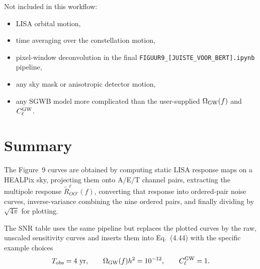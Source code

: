 \documentclass[11pt]{article}
\begin{document}
Not included in this workflow:
\begin{itemize}
\item LISA orbital motion,
\item time averaging over the constellation motion,
\item pixel-window deconvolution in the final \texttt{FIGUUR9\_[JUISTE\_VOOR\_BERT].ipynb} pipeline,
\item any sky mask or anisotropic detector motion,
\item any SGWB model more complicated than the user-supplied $\Omega_{\rm GW}(f)$ and $C_\ell^{\rm GW}$.
\end{itemize}

\section{Summary}
The Figure~9 curves are obtained by computing static LISA response maps on a HEALPix sky, projecting them onto A/E/T channel pairs, extracting the multipole response $\widetilde R^\ell_{OO'}(f)$, converting that response into ordered-pair noise curves, inverse-variance combining the nine ordered pairs, and finally dividing by $\sqrt{4\pi}$ for plotting.

The SNR table uses the same pipeline but replaces the plotted curves by the raw, unscaled sensitivity curves and inserts them into Eq.~(4.44) with the specific example choices
\begin{equation}
T_{\rm obs}=4~{\rm yr},
\qquad
\Omega_{\rm GW}(f)h^2=10^{-12},
\qquad
C_\ell^{\rm GW}=1.
\end{equation}
\end{document}

